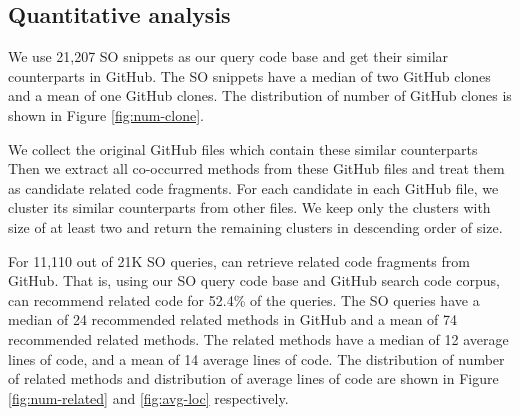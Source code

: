 \subsection{Quantitative analysis}

We use 21,207 SO snippets as our query code base and get their similar counterparts in GitHub. 
The SO snippets have a median of two GitHub clones and a mean of one GitHub clones. The distribution of number of GitHub clones is shown in Figure \ref{fig:num-clone}.

We collect the original GitHub files which contain these similar counterparts Then we extract all co-occurred methods from these GitHub files and treat them as candidate related code fragments. For each candidate in each GitHub file, we cluster its similar counterparts from other files. We keep only the clusters with size of at least two and return the remaining clusters in descending order of size.

For 11,110 out of 21K SO queries, {\tool} can retrieve related code fragments from GitHub. That is, using our SO query code base and GitHub search code corpus, {\tool} can recommend related code for 52.4\% of the queries. The SO queries have a median of 24 recommended related methods in GitHub and a mean of 74 recommended related methods. The related methods have a median of 12 average lines of code, and a mean of 14 average lines of code. The distribution of number of related methods and distribution of average lines of code are shown in Figure \ref{fig:num-related} and \ref{fig:avg-loc} respectively.




